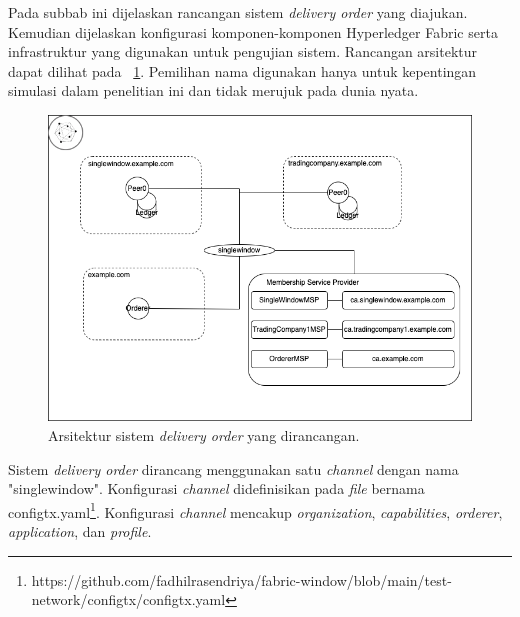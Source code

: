 Pada subbab ini dijelaskan rancangan sistem \textit{delivery order} yang diajukan. Kemudian dijelaskan konfigurasi komponen-komponen Hyperledger Fabric serta infrastruktur yang digunakan untuk pengujian sistem. Rancangan arsitektur dapat dilihat pada \pic~\ref{fig:fabric_arch_imp}. Pemilihan nama digunakan hanya untuk kepentingan simulasi dalam penelitian ini dan tidak merujuk pada dunia nyata.


\begin{figure}
	\centering
	\includegraphics[width=\textwidth]{assets/pics/fabric_arch_imp2}
	\caption{Arsitektur sistem \textit{delivery order} yang dirancangan.}
	\label{fig:fabric_arch_imp}
\end{figure}


Sistem \textit{delivery order} dirancang menggunakan satu \textit{channel} dengan nama "singlewindow". Konfigurasi \textit{channel} didefinisikan pada \textit{file} bernama configtx.yaml\footnote{https://github.com/fadhilrasendriya/fabric-window/blob/main/test-network/configtx/configtx.yaml}. Konfigurasi \textit{channel} mencakup \textit{organization}, \textit{capabilities}, \textit{orderer}, \textit{application}, dan \textit{profile}.

